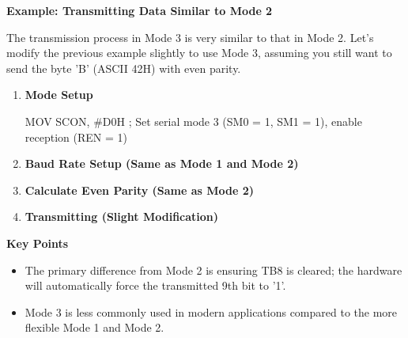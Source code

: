 \documentclass[
]{article}
\newenvironment{Shaded}{}{}
\newcommand{\NormalTok}[1]{#1}
\begin{document}
\textbf{Example: Transmitting Data Similar to Mode 2}

The transmission process in Mode 3 is very similar to that in Mode 2.
Let's modify the previous example slightly to use Mode 3, assuming you
still want to send the byte 'B' (ASCII 42H) with even parity.

\begin{enumerate}
\def\labelenumi{\arabic{enumi}.}
\item
  \textbf{Mode Setup}

\begin{Shaded}
\begin{Highlighting}[]
\NormalTok{MOV SCON, \#D0H ; Set serial mode 3 (SM0 = 1, SM1 = 1), enable reception (REN = 1)}
\end{Highlighting}
\end{Shaded}
\item
  \textbf{Baud Rate Setup (Same as Mode 1 and Mode 2)}
\item
  \textbf{Calculate Even Parity (Same as Mode 2)}
\item
  \textbf{Transmitting (Slight Modification)}

\begin{Shaded}
\end{Shaded}
\end{enumerate}

\textbf{Key Points}

\begin{itemize}
\item
  The primary difference from Mode 2 is ensuring TB8 is cleared; the
  hardware will automatically force the transmitted 9th bit to '1'.
\item
  Mode 3 is less commonly used in modern applications compared to the
  more flexible Mode 1 and Mode 2.
\end{itemize}
\end{document}
